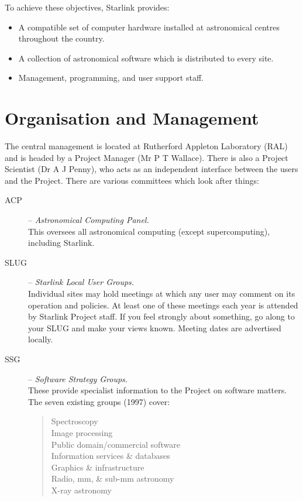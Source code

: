 \documentclass[twoside,11pt,nolof]{starlink}
\begin{document}
To achieve these objectives, Starlink provides:

\begin{itemize}
\item A compatible set of computer hardware installed at astronomical centres
throughout the country.
\item A collection of astronomical software which is distributed to every site.
\item Management, programming, and user support staff.
\end{itemize}

\newpage

\section{Organisation and Management}

The central management is located at Rutherford Appleton Laboratory (RAL) and
is headed by a Project Manager (Mr P T Wallace).
There is also a Project Scientist (Dr A J Penny), who acts as an independent
interface between the users and the Project.
There are various committees which look after things:

\begin{description}
\item [ACP] -- \emph{Astronomical Computing Panel.}\\
This oversees all astronomical computing (except supercomputing),
including Starlink.
\item [SLUG] -- \emph{Starlink Local User Groups.}\\
Individual sites may hold meetings at which any user may comment on its
operation and policies.
At least one of these meetings each year is attended by Starlink Project staff.
If you feel strongly about something, go along to your SLUG and make your
views known.
Meeting dates are advertised locally.
\item [SSG] -- \emph{Software Strategy Groups.}\\
These provide specialist information to the Project on software matters.
The seven existing groups (1997) cover:
\begin{quote}
\begin{description}
\item [Spectroscopy]
\item [Image processing]
\item [Public domain/commercial software]
\item [Information services \& databases]
\item [Graphics \& infrastructure]
\item [Radio, mm, \& sub-mm astronomy]
\item [X-ray astronomy]
\end{description}
\end{quote}
\end{description}
\end{document}
